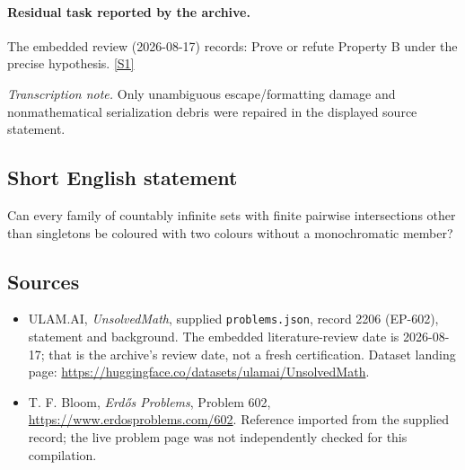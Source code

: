 \documentclass[11pt,a4paper]{article}
\newcommand{\sref}[2]{\hyperlink{source:#1:#2}{[S#2]}}
\begin{document}
\paragraph{Residual task reported by the archive.}

The embedded review (2026-08-17) records: Prove or refute Property B under the precise hypothesis. \sref{2206}{1}

{\small\emph{Transcription note.} Only unambiguous escape/formatting damage and nonmathematical serialization debris were repaired in the displayed source statement.}

\subsection{Short English statement}

Can every family of countably infinite sets with finite pairwise intersections other than singletons be coloured with two colours without a monochromatic member?

\subsection{Sources}

{\small

\begin{itemize}

\item[\hypertarget{source:2206:1}{S1}] ULAM.AI, \emph{UnsolvedMath}, supplied \texttt{problems.json}, record 2206 (EP-602), statement and background. The embedded literature-review date is 2026-08-17; that is the archive’s review date, not a fresh certification. Dataset landing page: \url{https://huggingface.co/datasets/ulamai/UnsolvedMath}.

\item[\hypertarget{source:2206:2}{S2}] T. F. Bloom, \emph{Erdős Problems}, Problem 602, \url{https://www.erdosproblems.com/602}. Reference imported from the supplied record; the live problem page was not independently checked for this compilation.

\end{itemize}

}

\label{end:2206}
\end{document}
